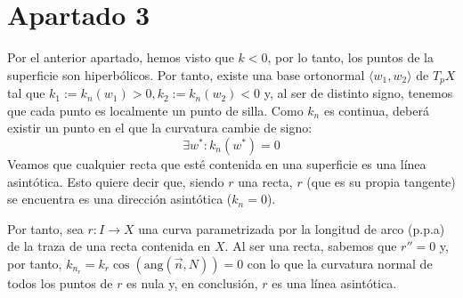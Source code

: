 \section{Apartado 3}
Por el anterior apartado, hemos visto que $k < 0$, por lo tanto, los puntos de
la superficie son hiperbólicos. Por tanto, existe una base ortonormal $\langle
w_1, w_2 \rangle$ de $T_pX$ tal que $k_1 := k_n \left( w_1 \right) > 0, k_2 :=
k_n \left( w_2 \right) < 0$ y, al ser de distinto signo, tenemos que cada punto
es localmente un punto de silla. Como $k_n$ es continua, deberá existir un punto
en el que la curvatura cambie de signo:
\[
\exists w^* : k_n\left( w^* \right) = 0
\]
Veamos que cualquier recta que esté contenida en una superficie es una línea
asintótica. Esto quiere decir que, siendo $r$ una recta, $r$ (que es su propia
tangente) se encuentra es una dirección asintótica ($k_n = 0$).

Por tanto, sea $r: I \rightarrow X$ una curva parametrizada por la longitud de
arco (p.p.a) de la traza de una recta contenida en $X$. Al ser una recta,
sabemos que $r'' = 0$ y, por tanto, $k_{n_r} = k_r \cos \left(
\mathrm{ang}\left( \overrightarrow{n}, N \right) \right) = 0$ con lo que la
curvatura normal de todos los puntos de $r$ es nula y, en conclusión, $r$ es una
línea asintótica.
